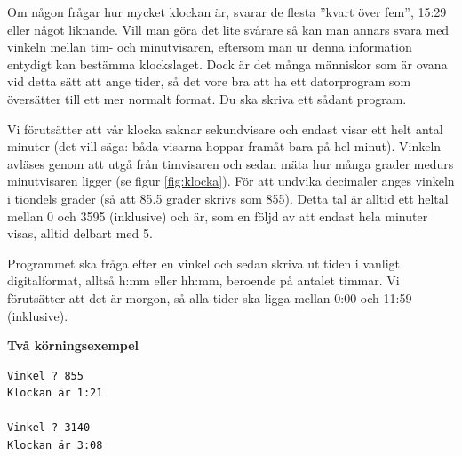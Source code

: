 \documentclass[a4paper,12pt]{article}
\begin{document}
Om någon frågar hur mycket klockan är, svarar de flesta ''kvart över fem'', 15:29 eller något liknande. Vill man göra det lite svårare så kan man annars svara med vinkeln mellan tim- och minutvisaren, eftersom man ur denna information entydigt kan bestämma klockslaget. Dock är det många människor som är ovana vid detta sätt att ange tider, så det vore bra att ha ett datorprogram som översätter till ett mer normalt format. Du ska skriva ett sådant program.

Vi förutsätter att vår klocka saknar sekundvisare och endast visar ett helt antal minuter (det vill säga: båda visarna hoppar framåt bara på hel minut). Vinkeln avläses genom att utgå från timvisaren och sedan mäta hur många grader medurs minutvisaren ligger (se figur \ref{fig:klocka}). För att undvika decimaler anges vinkeln i tiondels grader (så att 85.5 grader skrivs som 855). Detta tal är alltid ett heltal mellan 0 och 3595 (inklusive) och är, som en följd av att endast hela minuter visas, alltid delbart med 5.

Programmet ska fråga efter en vinkel och sedan skriva ut tiden i vanligt digitalformat, alltså h:mm eller hh:mm, beroende på antalet timmar. Vi förutsätter att det är morgon, så alla tider ska ligga mellan 0:00 och 11:59 (inklusive).

\textbf{Två körningsexempel}
\begin{lstlisting}
Vinkel ? 855 
Klockan är 1:21

Vinkel ? 3140  
Klockan är 3:08
\end{lstlisting}

\end{document}
